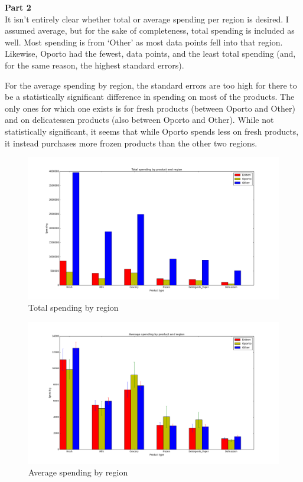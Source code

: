 \documentclass{article}
\begin{document}
	\noindent
	\textbf{Part 2}\\
	It isn't entirely clear whether total or average spending per region is desired. I assumed average, but for the sake of completeness, total spending is included as well. Most spending is from `Other' as most data points fell into that region. Likewise, Oporto had the fewest, data points, and the least total spending (and, for the same reason, the highest standard errors).
	\par 
	For the average spending by region, the standard errors are too high for there to be a statistically significant difference in spending on most of the products. The only ones for which one exists is for fresh products (between Oporto and Other) and on delicatessen products (also between Oporto and Other). While not statistically significant, it seems that while Oporto spends less on fresh products, it instead purchases more frozen products than the other two regions.
	\begin{figure}
		\includegraphics[scale=0.3]{part2a.png}
		\caption{Total spending by region}
	\end{figure}
	\begin{figure}
		\includegraphics[scale=0.3]{part2b.png}
		\caption{Average spending by region}
	\end{figure}
	
\end{document}
